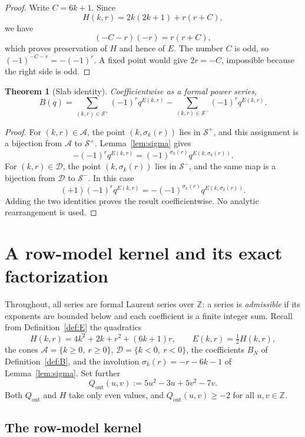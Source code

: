 \documentclass[12pt]{amsart}
\newtheorem{theorem}{Theorem}[section]
\theoremstyle{definition}
\theoremstyle{remark}
\newcommand{\ZZ}{\mathbb{Z}}
\newcommand{\Acone}{\mathcal{A}}
\newcommand{\Dcone}{\mathcal{D}}
\newcommand{\Splus}{\mathcal{S}^{+}}
\newcommand{\Sminus}{\mathcal{S}^{-}}
\begin{document}
\begin{proof}
Write $C=6k+1$.  Since
\[
  H(k,r)=2k(2k+1)+r(r+C),
\]
we have
\[
  (-C-r)(-r)=r(r+C),
\]
which proves preservation of $H$ and hence of $E$.  The number $C$ is
odd, so $(-1)^{-C-r}=-(-1)^r$.  A fixed point would give
$2r=-C$, impossible because the right side is odd.
\end{proof}

\begin{theorem}[Slab identity]\label{thm:slab}
Coefficientwise as a formal power series,
\[
  B(q)=
  \sum_{(k,r)\in\Splus}(-1)^r q^{E(k,r)}
  -
  \sum_{(k,r)\in\Sminus}(-1)^r q^{E(k,r)}.
\]
\end{theorem}

\begin{proof}
For $(k,r)\in\Acone$, the point
$(k,\sigma_k(r))$ lies in $\Splus$, and this assignment is a
bijection from $\Acone$ to $\Splus$.  Lemma~\ref{lem:sigma} gives
\[
  -(-1)^r q^{E(k,r)}
  =(-1)^{\sigma_k(r)}q^{E(k,\sigma_k(r))}.
\]
For $(k,r)\in\Dcone$, the point
$(k,\sigma_k(r))$ lies in $\Sminus$, and the same map is a bijection
from $\Dcone$ to $\Sminus$.  In this case
\[
  (+1)(-1)^r q^{E(k,r)}
  =-(-1)^{\sigma_k(r)}q^{E(k,\sigma_k(r))}.
\]
Adding the two identities proves the result coefficientwise.  No
analytic rearrangement is used.
\end{proof}

\section{A row-model kernel and its exact factorization}
\label{sec:mk-factorization}

Throughout, all series are formal Laurent series over $\ZZ$: a series
is \emph{admissible} if its exponents are bounded below and each
coefficient is a finite integer sum.  Recall from
Definition~\ref{def:E} the quadratics
\[
  H(k,r)=4k^2+2k+r^2+(6k+1)r,\qquad E(k,r)=\tfrac12 H(k,r),
\]
the cones $\Acone=\{k\ge0,\ r\ge0\}$, $\Dcone=\{k<0,\ r<0\}$, the
coefficients $B_N$ of Definition~\ref{def:B}, and the involution
$\sigma_k(r)=-r-6k-1$ of Lemma~\ref{lem:sigma}.  Set further
\[
  Q_{\mathrm{out}}(u,v):=5u^2-3u+5v^2-7v .
\]
Both $Q_{\mathrm{out}}$ and $H$ take only even values, and
$Q_{\mathrm{out}}(u,v)\ge-2$ for all $u,v\in\ZZ$.

\subsection{The row-model kernel}
\end{document}
